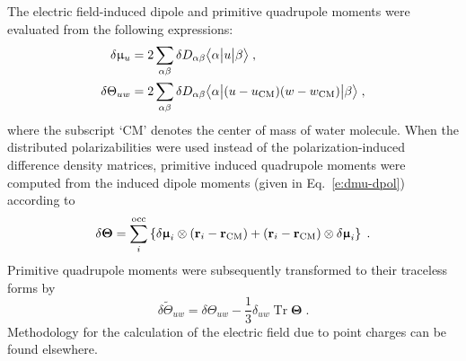 \documentclass[aip,amsmath,amssymb,reprint,floatfix]{revtex4-1}
\newcommand{\tbraket}[3]{\ensuremath{\bigl\langle {#1} \bigl\lvert {#2} \bigl\lvert {#3} \bigr\rangle}}
\newcommand{\BM}[1]{\bm{#1}}
\DeclareMathOperator{\Tr}{Tr}
\begin{document}
The electric field\hyp{}induced dipole and primitive quadrupole moments were evaluated from the following expressions:
%
\begin{subequations}\label{e:dmult}
  \begin{align}
   \delta \upmu_{u}   &= 2\sum_{\alpha\beta} \delta D_{\alpha\beta} \tbraket{\alpha}{u}{\beta}  \;,\\
   \delta \Theta_{uw} &= 2\sum_{\alpha\beta} \delta D_{\alpha\beta} \tbraket{\alpha}{(u-u_{\rm CM})(w-w_{\rm CM})}{\beta} \;, 
  \end{align}
\end{subequations}
%
where the subscript `CM' denotes the center of mass of water molecule.
When the distributed polarizabilities were used instead of the polarization\hyp{}induced 
difference density matrices, primitive induced quadrupole moments were computed from
the induced dipole moments (given in Eq.~\eqref{e:dmu-dpol}) according to
%
\begin{equation}
  \delta {\BM \Theta} = \sum_i^{\rm occ} 
   \left\{ 
       \delta {\BM \upmu}_i \otimes \left( {\bf r}_i - {\bf r}_{\rm CM} \right) 
      + \left( {\bf r}_i - {\bf r}_{\rm CM} \right) \otimes \delta {\BM \upmu}_i
   \right\} \;.
\end{equation}
%
Primitive quadrupole moments were subsequently transformed to their traceless forms by
%
\begin{equation}
  \delta \widetilde{\Theta}_{uw} = \delta \Theta_{uw} - \frac{1}{3} \delta_{uw} \Tr{\BM\Theta} \;.
\end{equation}
%
Methodology for the calculation of the electric field due to point charges
can be found elsewhere.\cite{Blasiak.Cho.JCP.2014}
\end{document}
